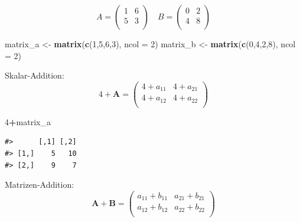 \documentclass[]{book}
\newenvironment{Shaded}{\begin{snugshade}}{\end{snugshade}}
\newcommand{\KeywordTok}[1]{\textcolor[rgb]{0.13,0.29,0.53}{\textbf{#1}}}
\newcommand{\DataTypeTok}[1]{\textcolor[rgb]{0.13,0.29,0.53}{#1}}
\newcommand{\DecValTok}[1]{\textcolor[rgb]{0.00,0.00,0.81}{#1}}
\newcommand{\StringTok}[1]{\textcolor[rgb]{0.31,0.60,0.02}{#1}}
\newcommand{\OperatorTok}[1]{\textcolor[rgb]{0.81,0.36,0.00}{\textbf{#1}}}
\newcommand{\NormalTok}[1]{#1}
\begin{document}
\[A = \left( 
\begin{array}{rrr}                                
1 & 6 \\                                               
5 & 3 \\                                               
\end{array}
\right) \quad B = \left( 
\begin{array}{rrr}                                
0 & 2 \\                                               
4 & 8 \\                                               
\end{array}\right)\]

\begin{Shaded}
\begin{Highlighting}[]
\NormalTok{matrix_a <-}\StringTok{ }\KeywordTok{matrix}\NormalTok{(}\KeywordTok{c}\NormalTok{(}\DecValTok{1}\NormalTok{,}\DecValTok{5}\NormalTok{,}\DecValTok{6}\NormalTok{,}\DecValTok{3}\NormalTok{), }\DataTypeTok{ncol =} \DecValTok{2}\NormalTok{)}
\NormalTok{matrix_b <-}\StringTok{ }\KeywordTok{matrix}\NormalTok{(}\KeywordTok{c}\NormalTok{(}\DecValTok{0}\NormalTok{,}\DecValTok{4}\NormalTok{,}\DecValTok{2}\NormalTok{,}\DecValTok{8}\NormalTok{), }\DataTypeTok{ncol =} \DecValTok{2}\NormalTok{)}
\end{Highlighting}
\end{Shaded}

Skalar-Addition: \[4+\boldsymbol{A}=
\left( 
\begin{array}{rrr}                                
4+a_{11} & 4+a_{21} \\                                               
4+a_{12} & 4+a_{22} \\                                               
\end{array}
\right)\]

\begin{Shaded}
\begin{Highlighting}[]
\DecValTok{4}\OperatorTok{+}\NormalTok{matrix_a}
\end{Highlighting}
\end{Shaded}

\begin{verbatim}
#>      [,1] [,2]
#> [1,]    5   10
#> [2,]    9    7
\end{verbatim}

Matrizen-Addition: \[\boldsymbol{A}+\boldsymbol{B}=
\left(
\begin{array}{rrr}                                
a_{11} + b_{11} & a_{21} + b_{21}\\                                               
a_{12} + b_{12} & a_{22} + b_{22}\\                                               
\end{array}
\right)\]
\end{document}
